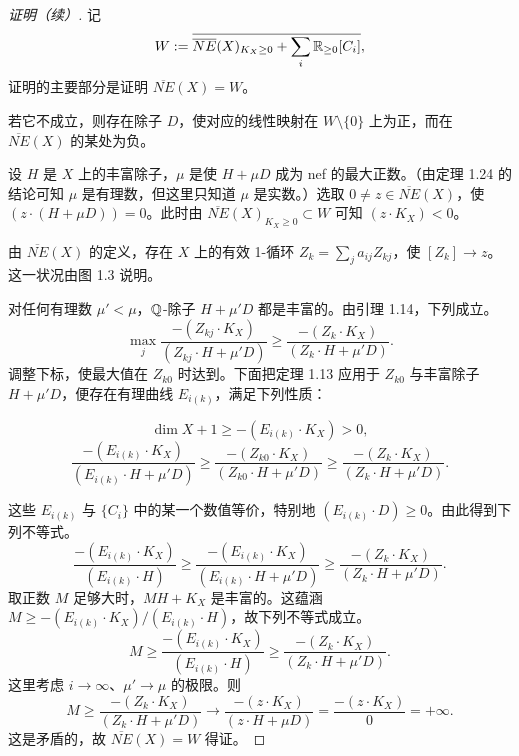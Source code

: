 \begin{figure}[htbp]
\centering
\resizebox{0.75\textwidth}{!}{}
\end{figure}

\begin{proof}[证明（续）]
记
\[ W:=\overline{\overline{NE}(X)_{K_X\ge0}+\sum_i\mathbb{R}_{\ge0}[C_i]}, \]
证明的主要部分是证明 $\overline{NE}(X)=W$。

若它不成立，则存在除子 $D$，使对应的线性映射在 $W\setminus\{0\}$ 上为正，而在 $\overline{NE}(X)$ 的某处为负。

设 $H$ 是 $X$ 上的丰富除子，$\mu$ 是使 $H+\mu D$ 成为 nef 的最大正数。（由定理 1.24 的结论可知 $\mu$ 是有理数，但这里只知道 $\mu$ 是实数。）选取 $0\ne z\in\overline{NE}(X)$，使 $(z\cdot(H+\mu D))=0$。此时由 $\overline{NE}(X)_{K_X\ge0}\subset W$ 可知 $(z\cdot K_X)<0$。

由 $\overline{NE}(X)$ 的定义，存在 $X$ 上的有效 1-循环 $Z_k=\sum_j a_{ij}Z_{kj}$，使 $[Z_k]\to z$。这一状况由图 1.3 说明。

对任何有理数 $\mu'<\mu$，$\mathbb{Q}$-除子 $H+\mu'D$ 都是丰富的。由引理 1.14，下列成立。
\[ \max_j\frac{-(Z_{kj}\cdot K_X)}{(Z_{kj}\cdot H+\mu'D)}\ge\frac{-(Z_k\cdot K_X)}{(Z_k\cdot H+\mu'D)}. \]
调整下标，使最大值在 $Z_{k0}$ 时达到。下面把定理 1.13 应用于 $Z_{k0}$ 与丰富除子 $H+\mu'D$，便存在有理曲线 $E_{i(k)}$，满足下列性质：

\[ \dim X+1\ge-(E_{i(k)}\cdot K_X)>0, \]
\[ \frac{-(E_{i(k)}\cdot K_X)}{(E_{i(k)}\cdot H+\mu'D)}\ge\frac{-(Z_{k0}\cdot K_X)}{(Z_{k0}\cdot H+\mu'D)}\ge\frac{-(Z_k\cdot K_X)}{(Z_k\cdot H+\mu'D)}. \]

\begin{figure}[htbp]
\centering
\resizebox{0.72\textwidth}{!}{}
\end{figure}

这些 $E_{i(k)}$ 与 $\{C_i\}$ 中的某一个数值等价，特别地 $(E_{i(k)}\cdot D)\ge0$。由此得到下列不等式。
\[ \frac{-(E_{i(k)}\cdot K_X)}{(E_{i(k)}\cdot H)}\ge\frac{-(E_{i(k)}\cdot K_X)}{(E_{i(k)}\cdot H+\mu'D)}\ge\frac{-(Z_k\cdot K_X)}{(Z_k\cdot H+\mu'D)}. \]
取正数 $M$ 足够大时，$MH+K_X$ 是丰富的。这蕴涵 $M\ge-(E_{i(k)}\cdot K_X)/(E_{i(k)}\cdot H)$，故下列不等式成立。
\[ M\ge\frac{-(E_{i(k)}\cdot K_X)}{(E_{i(k)}\cdot H)}\ge\frac{-(Z_k\cdot K_X)}{(Z_k\cdot H+\mu'D)}. \]
这里考虑 $i\to\infty$、$\mu'\to\mu$ 的极限。则
\[ M\ge\frac{-(Z_k\cdot K_X)}{(Z_k\cdot H+\mu'D)}\to\frac{-(z\cdot K_X)}{(z\cdot H+\mu D)}=\frac{-(z\cdot K_X)}{0}=+\infty. \]
这是矛盾的，故 $\overline{NE}(X)=W$ 得证。


\end{proof}
